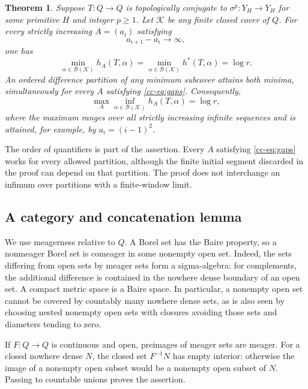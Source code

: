 \documentclass[11pt,reqno]{amsart}
\numberwithin{equation}{section}
\newtheorem{theorem}{Theorem}[section]
\theoremstyle{definition}
\newcommand{\hpat}{h^{*}}
\newcommand{\K}{\mathcal K}
\begin{document}
\begin{theorem}\label{cc-thm:cover}
Suppose $T:Q\to Q$ is topologically conjugate to $\sigma^p:Y_H\to Y_H$
for some primitive $H$ and integer $p\ge1$. Let $\K$ be any finite closed
cover of $Q$. For every strictly increasing $A=(a_i)$ satisfying
\begin{equation}\label{cc-eq:gaps}
 a_{i+1}-a_i\longrightarrow\infty,
\end{equation}
one has
\begin{equation}\label{cc-eq:coverformula}
 \min_{\alpha\in\mathcal B(\K)} h_A(T,\alpha)
 =\min_{\alpha\in\mathcal B(\K)}\hpat(T,\alpha)
 =\log r.
\end{equation}
An ordered difference partition of any minimum subcover attains both
minima, simultaneously for every $A$ satisfying \eqref{cc-eq:gaps}.
Consequently,
\begin{equation}\label{cc-eq:coverminimax}
 \max_A\inf_{\alpha\in\mathcal B(\K)}h_A(T,\alpha)=\log r,
\end{equation}
where the maximum ranges over all strictly increasing infinite sequences
and is attained, for example, by $a_i=(i-1)^2$.
\end{theorem}

The order of quantifiers is part of the assertion. Every $A$ satisfying
\eqref{cc-eq:gaps} works for every allowed partition, although the finite
initial segment discarded in the proof can depend on that partition.
The proof does not interchange an infimum over partitions with a
finite-window limit.

\subsection{A category and concatenation lemma}

We use meagerness relative to $Q$. A Borel set has the Baire property,
so a nonmeager Borel set is comeager in some nonempty open set. Indeed,
the sets differing from open sets by meager sets form a sigma-algebra:
for complements, the additional difference is contained in the
nowhere dense boundary of an open set. A compact metric space is a
Baire space. In particular, a nonempty open set cannot be covered by
countably many nowhere dense sets, as is also seen by choosing nested
nonempty open sets with closures avoiding those sets and diameters
tending to zero.

If $F:Q\to Q$ is continuous and open, preimages of meager sets are
meager. For a closed nowhere dense $N$, the closed set $F^{-1}N$ has
empty interior: otherwise the image of a nonempty open subset would be
a nonempty open subset of $N$. Passing to countable unions proves the
assertion.
\end{document}
